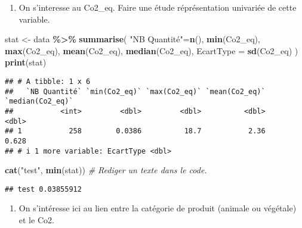 \documentclass[
]{article}
\newenvironment{Shaded}{\begin{snugshade}}{\end{snugshade}}
\newcommand{\AttributeTok}[1]{\textcolor[rgb]{0.13,0.29,0.53}{#1}}
\newcommand{\CommentTok}[1]{\textcolor[rgb]{0.56,0.35,0.01}{\textit{#1}}}
\newcommand{\FunctionTok}[1]{\textcolor[rgb]{0.13,0.29,0.53}{\textbf{#1}}}
\newcommand{\NormalTok}[1]{#1}
\newcommand{\OtherTok}[1]{\textcolor[rgb]{0.56,0.35,0.01}{#1}}
\newcommand{\SpecialCharTok}[1]{\textcolor[rgb]{0.81,0.36,0.00}{\textbf{#1}}}
\newcommand{\StringTok}[1]{\textcolor[rgb]{0.31,0.60,0.02}{#1}}
\providecommand{\tightlist}{%
  \setlength{\itemsep}{0pt}\setlength{\parskip}{0pt}}
\begin{document}
\begin{enumerate}
\def\labelenumi{\arabic{enumi}.}
\tightlist
\item
  On s'interesse au Co2\_eq. Faire une étude réprésentation univariée de
  cette variable.
\end{enumerate}

\begin{Shaded}
\begin{Highlighting}[]
\NormalTok{stat }\OtherTok{\textless{}{-}}\NormalTok{ data }\SpecialCharTok{\%\textgreater{}\%} 
  \FunctionTok{summarise}\NormalTok{(}
    \StringTok{"NB Quantité"}\OtherTok{=}\FunctionTok{n}\NormalTok{(),}
    \FunctionTok{min}\NormalTok{(Co2\_eq),}
    \FunctionTok{max}\NormalTok{(Co2\_eq),}
    \FunctionTok{mean}\NormalTok{(Co2\_eq),}
    \FunctionTok{median}\NormalTok{(Co2\_eq),}
    \AttributeTok{EcartType =} \FunctionTok{sd}\NormalTok{(Co2\_eq)}
\NormalTok{  )}
\FunctionTok{print}\NormalTok{(stat)}
\end{Highlighting}
\end{Shaded}

\begin{verbatim}
## # A tibble: 1 x 6
##   `NB Quantité` `min(Co2_eq)` `max(Co2_eq)` `mean(Co2_eq)` `median(Co2_eq)`
##           <int>         <dbl>         <dbl>          <dbl>            <dbl>
## 1           258        0.0386          18.7           2.36            0.628
## # i 1 more variable: EcartType <dbl>
\end{verbatim}

\begin{Shaded}
\begin{Highlighting}[]
\FunctionTok{cat}\NormalTok{(}\StringTok{"test"}\NormalTok{, }\FunctionTok{min}\NormalTok{(stat)) }\CommentTok{\# Rediger un texte dans le code.}
\end{Highlighting}
\end{Shaded}

\begin{verbatim}
## test 0.03855912
\end{verbatim}

\begin{enumerate}
\def\labelenumi{\arabic{enumi}.}
\setcounter{enumi}{1}
\tightlist
\item
  On s'intéresse ici au lien entre la catégorie de produit (animale ou
  végétale) et le Co2.
\end{enumerate}
\end{document}
